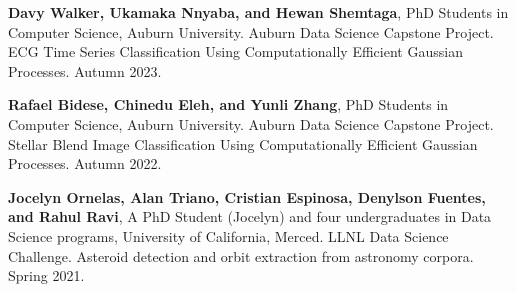 \begin{innerlist}

  \item[] \textbf{Davy Walker, Ukamaka Nnyaba, and Hewan Shemtaga},
  PhD Students in Computer Science,
  Auburn University.
  Auburn Data Science Capstone Project.
  ECG Time Series Classification Using Computationally Efficient Gaussian
  Processes.
  Autumn 2023.

  \item[] \textbf{Rafael Bidese, Chinedu Eleh, and Yunli Zhang},
  PhD Students in Computer Science,
  Auburn University.
  Auburn Data Science Capstone Project.
  Stellar Blend Image Classification Using Computationally Efficient Gaussian
  Processes.
  Autumn 2022.

  \item[] \textbf{Jocelyn Ornelas, Alan Triano, Cristian Espinosa, Denylson Fuentes, and Rahul Ravi},
  A PhD Student (Jocelyn) and four undergraduates in Data Science programs,
  University of California, Merced.
  LLNL Data Science Challenge.
  Asteroid detection and orbit extraction from astronomy corpora.
  Spring 2021.

\end{innerlist}
